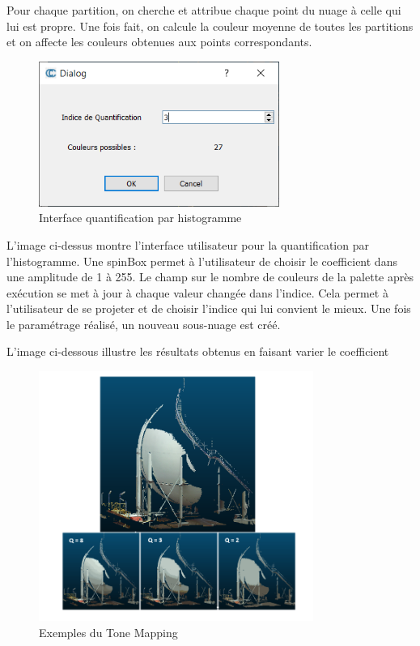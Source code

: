 \documentclass[12pt,titlepage,french]{article}
\begin{document}
Pour chaque partition, on cherche et attribue chaque point du nuage à celle qui lui est propre. Une fois fait,
on calcule la couleur moyenne de toutes les partitions et on affecte les couleurs obtenues aux points correspondants.
\newline

 \begin{figure}[H]
\center
\includegraphics[width=0.7\textwidth]{./img/HistogramDialog.png}
\caption{\label{} Interface quantification par histogramme}
\end{figure}

L'image ci-dessus montre l'interface utilisateur pour la quantification par l'histogramme.
Une spinBox permet à l'utilisateur de choisir le coefficient dans une amplitude de 1 à 255.
 Le champ sur le nombre de couleurs de la palette après exécution se met à jour à chaque valeur changée dans l'indice. Cela permet à l'utilisateur de se projeter et de choisir l'indice qui lui convient le mieux.
  Une fois le paramétrage réalisé, un nouveau sous-nuage est créé.

L'image ci-dessous illustre les résultats obtenus en faisant varier le coefficient\newline


\begin{figure}[H]
\center
\includegraphics[width=0.8\textwidth]{./img/ExpToonMapping.png}
\caption{\label{} Exemples du Tone Mapping}
\end{figure}
\end{document}
